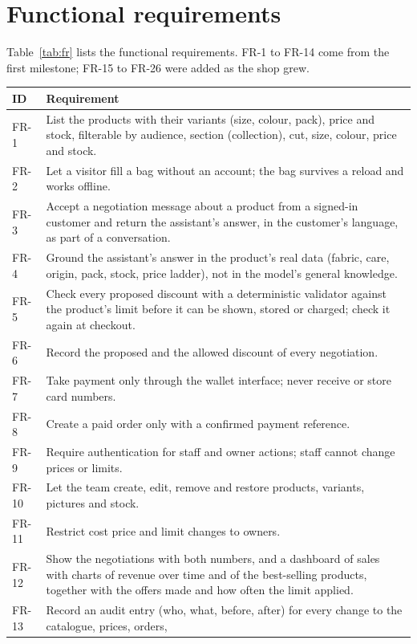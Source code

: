 \section{Functional requirements}

Table~\ref{tab:fr} lists the functional requirements. FR-1 to FR-14 come from the first milestone; FR-15 to FR-26
were added as the shop grew.

\begin{longtable}{p{1.4cm} p{12.6cm}}
	\toprule
	\textbf{ID} & \textbf{Requirement} \\
	\midrule
	\endhead
	FR-1 & List the products with their variants (size, colour, pack), price and stock, filterable by audience,
	section (collection), cut, size, colour, price and stock. \\
	FR-2 & Let a visitor fill a bag without an account; the bag survives a reload and works offline. \\
	FR-3 & Accept a negotiation message about a product from a signed-in customer and return the assistant's answer,
	in the customer's language, as part of a conversation. \\
	FR-4 & Ground the assistant's answer in the product's real data (fabric, care, origin, pack, stock, price ladder),
	not in the model's general knowledge. \\
	FR-5 & Check every proposed discount with a deterministic validator against the product's limit before it can be
	shown, stored or charged; check it again at checkout. \\
	FR-6 & Record the proposed and the allowed discount of every negotiation. \\
	FR-7 & Take payment only through the wallet interface; never receive or store card numbers. \\
	FR-8 & Create a paid order only with a confirmed payment reference. \\
	FR-9 & Require authentication for staff and owner actions; staff cannot change prices or limits. \\
	FR-10 & Let the team create, edit, remove and restore products, variants, pictures and stock. \\
	FR-11 & Restrict cost price and limit changes to owners. \\
	FR-12 & Show the negotiations with both numbers, and a dashboard of sales with charts of revenue over time and of
	the best-selling products, together with the offers made and how often the limit applied. \\
	FR-13 & Record an audit entry (who, what, before, after) for every change to the catalogue, prices, orders,

\end{longtable}
